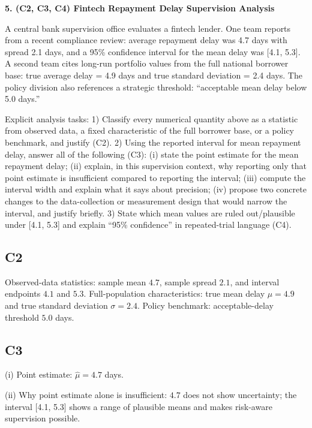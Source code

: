 \begin{ExamProblems}
		\newpage
		\item
		\textbf{5. (C2, C3, C4) Fintech Repayment Delay Supervision Analysis}
		
		A central bank supervision office evaluates a fintech lender.
		One team reports from a recent compliance review: average repayment delay was 4.7 days with spread 2.1 days, and a 95\% confidence interval for the mean delay was [4.1, 5.3].
		A second team cites long-run portfolio values from the full national borrower base: true average delay = 4.9 days and true standard deviation = 2.4 days.
		The policy division also references a strategic threshold: ``acceptable mean delay below 5.0 days.''
		
		Explicit analysis tasks:
		1) Classify every numerical quantity above as a statistic from observed data, a fixed characteristic of the full borrower base, or a policy benchmark, and justify (C2).
		2) Using the reported interval for mean repayment delay, answer all of the following (C3): (i) state the point estimate for the mean repayment delay; (ii) explain, in this supervision context, why reporting only that point estimate is insufficient compared to reporting the interval; (iii) compute the interval width and explain what it says about precision; (iv) propose two concrete changes to the data-collection or measurement design that would narrow the interval, and justify briefly.
		3) State which mean values are ruled out/plausible under [4.1, 5.3] and explain ``95\% confidence'' in repeated-trial language (C4).
		
		\subsection*{C2}
		Observed-data statistics: sample mean $4.7$, sample spread $2.1$, and interval endpoints $4.1$ and $5.3$.
		Full-population characteristics: true mean delay $\mu=4.9$ and true standard deviation $\sigma=2.4$.
		Policy benchmark: acceptable-delay threshold $5.0$ days.
		
		\subsection*{C3}
		(i) Point estimate: $\hat{\mu}=4.7$ days.
		
		(ii) Why point estimate alone is insufficient: $4.7$ does not show uncertainty; the interval [4.1, 5.3] shows a range of plausible means and makes risk-aware supervision possible.
		

\end{ExamProblems}
